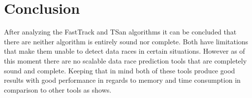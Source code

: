 \documentclass[12pt]{article}
\begin{document}
	\section{Conclusion}
	After analyzing the FastTrack and TSan algorithms it can be concluded that there are neither algorithm is entirely sound nor complete. Both have limitations that make them unable to detect data races in certain situations. However as of this moment there are no scalable data race prediction tools that are completely sound and complete. Keeping that in mind both of these tools produce good results with good performance in regards to memory and time consumption in comparison to other tools as \cite{flanagan} shows.
	\newpage                                          
	\printbibliography[heading= bibintoc, title={List of Literature}]
	\newpage
	{\hypersetup{linkcolor=black}
		\listoffigures
		\newpage
		\listoftables
		\newpage
		\lstlistoflistings
	}
\end{document}
